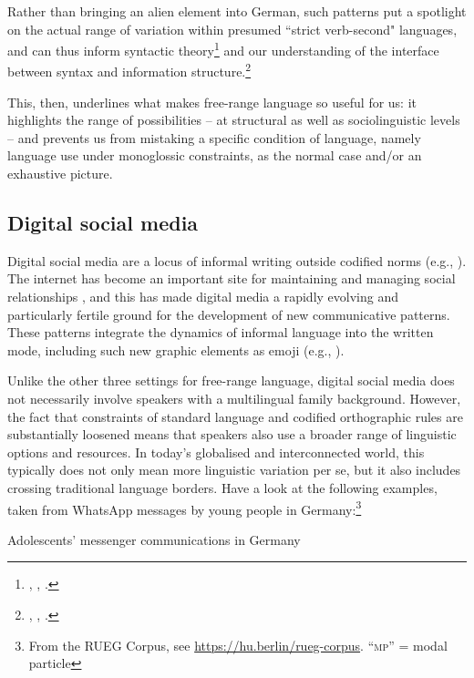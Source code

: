 Rather than bringing an alien element into German, such patterns put a spotlight on the actual range of variation within presumed “strict verb-second" languages, and can thus inform syntactic theory\footnote{ \citet{teVelde2017}, \citet{Walkden2017}, \citet{Bunk2020}.} and our understanding of the interface between syntax and information structure.\footnote{\citet{Wiese2011}, \citet{FreywaldEtal2015}, \citet{WieseEtal2017,WieseEtal2020}.}

This, then, underlines what makes free-range language so useful for us: it highlights the range of possibilities – at structural as well as sociolinguistic levels – and prevents us from mistaking a specific condition of language, namely language use under monoglossic constraints, as the normal case and/or an exhaustive picture.

\subsection{Digital social media}
\hypertarget{Toc125444656}{}
Digital social media are a locus of informal writing outside codified norms (e.g., \citealt{AndroutsopoulosBusch2020}). The internet has become an important site for maintaining and managing social relationships \citep{McCulloch2019}, and this has made digital media a rapidly evolving and particularly fertile ground for the development of new communicative patterns. These patterns integrate the dynamics of informal language into the written mode, including such new graphic elements as emoji (e.g., \citealt{DainasHerring2021}).

Unlike the other three settings for free-range language, digital social media does not necessarily involve speakers with a multilingual family background. However, the fact that constraints of standard language and codified orthographic rules are substantially loosened means that speakers also use a broader range of linguistic options and resources. In today’s globalised and interconnected world, this typically does not only mean more linguistic variation per se, but it also includes crossing traditional language borders. Have a look at the following examples, taken from WhatsApp messages by young people in Germany:\footnote{From the RUEG Corpus, see \url{https://hu.berlin/rueg-corpus}. “\textsc{mp}” = modal particle}

\ea\label{ex:key:4}\label{bkm:Ref113003596}Adolescents’ messenger communications in Germany\\
\ea

